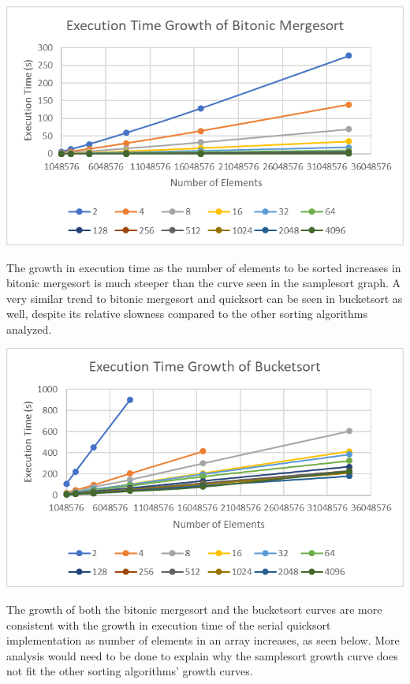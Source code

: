 \documentclass[10pt,letterpaper]{article}
\begin{document}
\begin{multicols}{2}
\begin{center}
\includegraphics[scale=1.3]{bitonic_growth}
\end{center}

The growth in execution time as the number of elements to be sorted increases in bitonic mergesort is much steeper than the curve seen in the samplesort graph. A very similar trend to bitonic mergesort and quicksort can be seen in bucketsort as well, despite its relative slowness compared to the other sorting algorithms analyzed.

\begin{center}
\includegraphics[scale=1.3]{bucket_growth}
\end{center}

The growth of both the bitonic mergesort and the bucketsort curves are more consistent with the growth in execution time of the serial quicksort implementation as number of elements in an array increases, as seen below. More analysis would need to be done to explain why the samplesort growth curve does not fit the other sorting algorithms' growth curves.


\end{multicols}
\end{document}
